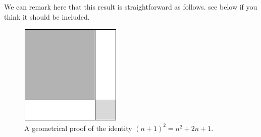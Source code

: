 {\Denis We can remark here that this result is straightforward as follows.
see below if you think it should be included.}
\begin{figure}[h]
\begin{center}
       \includegraphics[scale=0.4]{FiguresMaths/proofa2plusb2}
\caption{A geometrical proof of the identity $(n+1)^2 = n^2 + 2n + 1$.}
       \label{fig:proofa2plusb2}
\end{center}
\end{figure}

